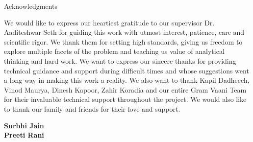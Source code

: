 \begin{center}
\LARGE{Acknowledgments} 
\end{center}

\vspace{0.5in}

We would like to express our heartiest gratitude to our supervisor Dr. Aaditeshwar Seth for guiding this work with utmost interest,
patience, care and scientific rigor. We thank them for setting high standards,
giving us freedom to explore multiple facets of the problem and teaching us
value of analytical thinking and hard work.
We want to express our sincere thanks for providing technical guidance and support during
difficult times and whose suggestions went a long way in making this work a
reality. We also want to thank Kapil Dadheech, Vinod Maurya, Dinesh Kapoor, Zahir Koradia and our entire Gram Vaani Team for their invaluable technical support throughout the project. We would also like to thank our family and friends for their love and support.

\vspace{1.5in}

{\bfseries Surbhi Jain}
\ \\
{\bfseries Preeti Rani}
